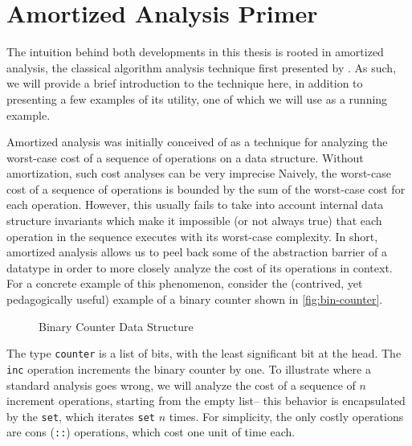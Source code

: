 

\section{Amortized Analysis Primer}
\label{sec:amortized-primer}
The intuition behind both developments in this thesis is rooted in amortized analysis, the classical algorithm analysis technique first presented by \citet{tarjan:amortized-complexity}. As such, we will provide a brief introduction to the technique here, in addition to presenting a few examples of its utility, one of which we will use as a running example.

Amortized analysis was initially conceived of as a technique for analyzing the worst-case cost of a sequence of operations on a data structure. Without amortization, such cost analyses can be very imprecise Naively, the worst-case cost of a sequence of operations is bounded by the sum of the worst-case cost for each operation. However, this usually fails to take into account internal data structure invariants which make it impossible (or not always true) that each operation in the sequence executes with its worst-case complexity. In short, amortized analysis allows us to peel back some of the abstraction barrier of a datatype in order to more closely analyze the cost of its operations in context. For a concrete example of this phenomenon, consider the (contrived, yet pedagogically useful) example of a binary counter shown in \autoref{fig:bin-counter}.

\begin{figure}
  \caption{Binary Counter Data Structure}
  \label{fig:bin-counter}
\end{figure}

The type \texttt{counter} is a list of bits, with the least significant bit at the head. The \texttt{inc} operation increments the binary counter by one. To illustrate where a standard analysis goes wrong, we will analyze the cost of a sequence of $n$ increment operations, starting from the empty list-- this behavior is encapsulated by the \texttt{set}, which iterates \texttt{set} $n$ times. For simplicity, the only costly operations are cons (\texttt{::}) operations, which cost one unit of time each.

